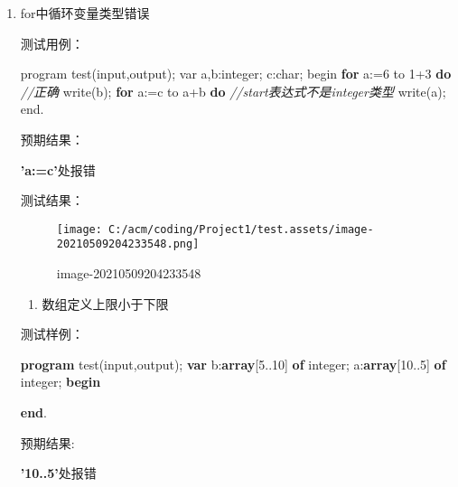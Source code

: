 \documentclass[]{ctexart}
\newenvironment{Shaded}{}{}
\newcommand{\CommentTok}[1]{\textcolor[rgb]{0.38,0.63,0.69}{\textit{#1}}}
\newcommand{\ControlFlowTok}[1]{\textcolor[rgb]{0.00,0.44,0.13}{\textbf{#1}}}
\newcommand{\DataTypeTok}[1]{\textcolor[rgb]{0.56,0.13,0.00}{#1}}
\newcommand{\DecValTok}[1]{\textcolor[rgb]{0.25,0.63,0.44}{#1}}
\newcommand{\KeywordTok}[1]{\textcolor[rgb]{0.00,0.44,0.13}{\textbf{#1}}}
\newcommand{\NormalTok}[1]{#1}
\begin{document}
\begin{enumerate}
\def\labelenumi{\arabic{enumi}.}
\item
  for中循环变量类型错误

  测试用例：

\begin{Shaded}
\begin{Highlighting}[]
\NormalTok{program test(input,output);  }
\NormalTok{var a,b:integer;  }
\NormalTok{    c:}\DataTypeTok{char}\NormalTok{;  }
\NormalTok{begin  }
\ControlFlowTok{for}\NormalTok{ a:=}\DecValTok{6}\NormalTok{ to }\DecValTok{1+3} \ControlFlowTok{do}  \CommentTok{//正确}
\NormalTok{    write(b);  }
\ControlFlowTok{for}\NormalTok{ a:=c to a+b }\ControlFlowTok{do} \CommentTok{//start表达式不是integer类型  }
\NormalTok{    write(a);  }
\NormalTok{end. }
\end{Highlighting}
\end{Shaded}

  预期结果：

  \textbf{'a:=c'}处报错

  测试结果：

  \begin{figure}
  \centering
  \texttt{[image: C:/acm/coding/Project1/test.assets/image-20210509204233548.png]}
  \caption{image-20210509204233548}
  \end{figure}

  \begin{enumerate}
  \def\labelenumii{\arabic{enumii}.}
  \item
    数组定义上限小于下限
  \end{enumerate}

  测试样例：

\begin{Shaded}
\begin{Highlighting}[]
\KeywordTok{program}\NormalTok{ test(input,output);  }
\KeywordTok{var}\NormalTok{ b:}\KeywordTok{array}\NormalTok{[}\DecValTok{5}\NormalTok{..}\DecValTok{10}\NormalTok{] }\KeywordTok{of} \DataTypeTok{integer}\NormalTok{;}
\NormalTok{    a:}\KeywordTok{array}\NormalTok{[}\DecValTok{10}\NormalTok{..}\DecValTok{5}\NormalTok{] }\KeywordTok{of} \DataTypeTok{integer}\NormalTok{;}
\KeywordTok{begin}  
  
\KeywordTok{end}\NormalTok{.  }
\end{Highlighting}
\end{Shaded}

  预期结果:

  \textbf{'10..5'}处报错


\end{enumerate}
\end{document}
